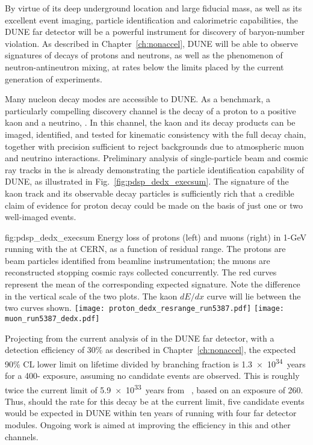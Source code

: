 By virtue of its deep underground location and large fiducial 
mass, as well as its excellent event imaging, particle 
identification and 
calorimetric capabilities, the DUNE far detector will be 
a powerful instrument for discovery of baryon-number violation.
As described in Chapter~\ref{ch:nonaccel}, DUNE will be able 
to observe signatures of decays of protons and neutrons, 
as well as the phenomenon of neutron-antineutron mixing, at 
rates below the limits placed by the current generation of 
experiments.

Many nucleon decay modes are accessible to DUNE.  
As a benchmark, a particularly compelling discovery channel 
is the decay of a proton to a positive kaon and a neutrino, 
\ptoknubar.  In this channel, the kaon and its decay products 
can be imaged, identified, and tested for kinematic consistency 
with the full decay chain, together with precision sufficient to 
reject backgrounds due to atmospheric muon and neutrino 
interactions. 
Preliminary analysis of single-particle beam and cosmic ray tracks 
in the  \lartpc is already demonstrating the particle 
identification capability of DUNE, as illustrated in 
Fig.~\ref{fig:pdsp_dedx_execsum}.  
The signature of the kaon track and its observable decay particles is 
sufficiently rich that a credible claim of evidence for 
proton decay could be made on the basis of just 
one or two well-imaged events.

\begin{dunefigure}{fig:pdsp_dedx_execsum}
{Energy loss of protons (left) and muons (right) in 1-GeV  
running with the  \lartpc at CERN, as a function of 
residual range.  The protons are beam particles identified from 
beamline instrumentation; the muons are reconstructed stopping 
cosmic rays collected concurrently.  
The red curves represent the mean of the 
corresponding expected signature.  Note the difference in 
the vertical scale of the two plots.  The kaon $dE/dx$ curve 
will lie between the two curves shown.}
\texttt{[image: proton\_dedx\_resrange\_run5387.pdf]}\hspace{0.05\linewidth}
\texttt{[image: muon\_run5387\_dedx.pdf]}
\end{dunefigure}

Projecting from the current analysis of \ptoknubar in the DUNE 
far detector, with a detection efficiency of \num{30}\% as described in Chapter~\ref{ch:nonaccel}, the 
expected 90\% CL lower limit on lifetime divided by branching 
fraction is \SI{1.3e34}{years} for a 
\num{400}-\SI{}{\ktyr} 
exposure, assuming no candidate events are observed.  This 
is roughly twice the current limit of 
\SI{5.9e33}{years} from \superk~\cite{Abe:2014mwa}, 
based on an exposure of \SI{260}{\ktyr}.  Thus, should the rate 
for this decay be at the current \superk limit, five candidate 
events would be expected in DUNE within ten years 
of running with four far detector modules.  Ongoing work is aimed 
at improving the efficiency in this and other channels.

